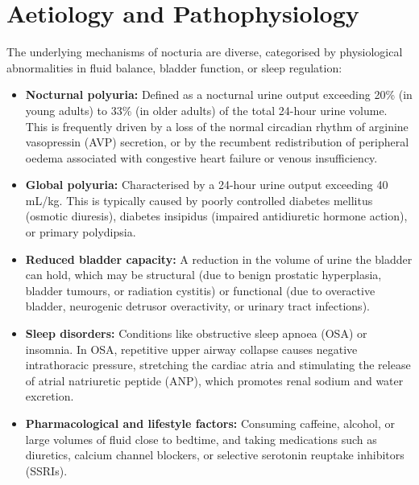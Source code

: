 \section*{Aetiology and Pathophysiology}
The underlying mechanisms of nocturia are diverse, categorised by physiological abnormalities in fluid balance, bladder function, or sleep regulation:
\begin{itemize}
    \item \textbf{Nocturnal polyuria:} Defined as a nocturnal urine output exceeding 20\% (in young adults) to 33\% (in older adults) of the total 24-hour urine volume. This is frequently driven by a loss of the normal circadian rhythm of arginine vasopressin (AVP) secretion, or by the recumbent redistribution of peripheral oedema associated with congestive heart failure or venous insufficiency.
    \item \textbf{Global polyuria:} Characterised by a 24-hour urine output exceeding 40 mL/kg. This is typically caused by poorly controlled diabetes mellitus (osmotic diuresis), diabetes insipidus (impaired antidiuretic hormone action), or primary polydipsia.
    \item \textbf{Reduced bladder capacity:} A reduction in the volume of urine the bladder can hold, which may be structural (due to benign prostatic hyperplasia, bladder tumours, or radiation cystitis) or functional (due to overactive bladder, neurogenic detrusor overactivity, or urinary tract infections).
    \item \textbf{Sleep disorders:} Conditions like obstructive sleep apnoea (OSA) or insomnia. In OSA, repetitive upper airway collapse causes negative intrathoracic pressure, stretching the cardiac atria and stimulating the release of atrial natriuretic peptide (ANP), which promotes renal sodium and water excretion.
    \item \textbf{Pharmacological and lifestyle factors:} Consuming caffeine, alcohol, or large volumes of fluid close to bedtime, and taking medications such as diuretics, calcium channel blockers, or selective serotonin reuptake inhibitors (SSRIs).
\end{itemize}

